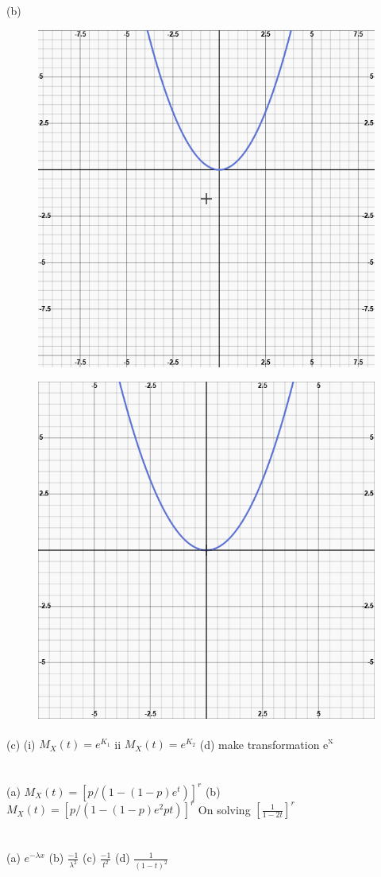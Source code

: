 \documentclass{report}
\begin{document}
(b) \begin{figure}
	\centering
	\includegraphics[width=0.7\linewidth]{K1_T}
	\caption{}
	\label{fig:K1_T}
\end{figure}
\begin{figure}
	\centering
	\includegraphics[width=0.7\linewidth]{K2_T}
	\caption{}
	\label{fig:K2_T}
\end{figure}
{\newline}
(c) (i) {$M_{X}(t) = e^{K_{1}}$} {\newline}
{ii} {$M_{X}(t) = e^{K_{2}}$} {\newline}
{\newline}
(d) make transformation e{\textsuperscript{x}} 
{\newline}

\section{}
(a) {$M_{X}(t) = [p/(1 - (1-p)e^t)]^r$}
{\newline}
(b) {$M_{X}(t) = [p/(1 - (1-p)e^2pt)]^r$} On solving $[\frac{1}{1-2t}]^r$
{\newline}

\section{}
(a) {$e^{-\lambda x}$} {\newline}
(b) {$\frac{-1}{\lambda ^ 2}$} {\newline}
(c) {$\frac{-1}{t^2}$} {\newline}
(d) {$\frac{1}{(1-t)^2}$}
{\newline}
\end{document}

